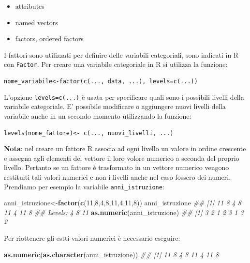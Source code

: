 \documentclass[
]{book}
\newenvironment{Shaded}{\begin{snugshade}}{\end{snugshade}}
\newcommand{\CommentTok}[1]{\textcolor[rgb]{0.56,0.35,0.01}{\textit{#1}}}
\newcommand{\DecValTok}[1]{\textcolor[rgb]{0.00,0.00,0.81}{#1}}
\newcommand{\KeywordTok}[1]{\textcolor[rgb]{0.13,0.29,0.53}{\textbf{#1}}}
\newcommand{\NormalTok}[1]{#1}
\providecommand{\tightlist}{%
  \setlength{\itemsep}{0pt}\setlength{\parskip}{0pt}}
\begin{document}
\begin{itemize}
\tightlist
\item
  attributes
\item
  named vectors
\item
  factors, ordered factors
\end{itemize}

I fattori sono utilizzati per definire delle variabili categoriali, sono indicati in R con \texttt{Factor}. Per creare una variabile categoriale in R si utilizza la funzione:

\texttt{nome\_variabile\textless{}-factor(c(...,\ data,\ ...),\ levels=c(...))}

L'opzione \texttt{levels=c(...)} è usata per specificare quali sono i possibili livelli della variabile categoriale. E' possibile modificare o aggiungere nuovi livelli della variabile anche in un secondo momento utilizzando la funzione:

\texttt{levels(nome\_fattore)\textless{}-\ c(...,\ nuovi\_livelli,\ ...)}

\textbf{Nota}: nel creare un fattore R associa ad ogni livello un valore in ordine crescente e assegna agli elementi del vettore il loro volore numerico a seconda del proprio livello. Pertanto se un fattore è trasformato in un vettore numerico vengono restituiti tali valori numerici e non i livelli anche nel caso fossero dei numeri. Prendiamo per esempio la variabile \texttt{anni\_istruzione}:

\begin{Shaded}
\begin{Highlighting}[]
\NormalTok{anni_istruzione<-}\KeywordTok{factor}\NormalTok{(}\KeywordTok{c}\NormalTok{(}\DecValTok{11}\NormalTok{,}\DecValTok{8}\NormalTok{,}\DecValTok{4}\NormalTok{,}\DecValTok{8}\NormalTok{,}\DecValTok{11}\NormalTok{,}\DecValTok{4}\NormalTok{,}\DecValTok{11}\NormalTok{,}\DecValTok{8}\NormalTok{))}
\NormalTok{anni_istruzione}
\CommentTok{## [1] 11 8  4  8  11 4  11 8 }
\CommentTok{## Levels: 4 8 11}
\KeywordTok{as.numeric}\NormalTok{(anni_istruzione)}
\CommentTok{## [1] 3 2 1 2 3 1 3 2}
\end{Highlighting}
\end{Shaded}

Per riottenere gli estti valori numerici è necessario eseguire:

\begin{Shaded}
\begin{Highlighting}[]
\KeywordTok{as.numeric}\NormalTok{(}\KeywordTok{as.character}\NormalTok{(anni_istruzione))}
\CommentTok{## [1] 11  8  4  8 11  4 11  8}
\end{Highlighting}
\end{Shaded}
\end{document}
